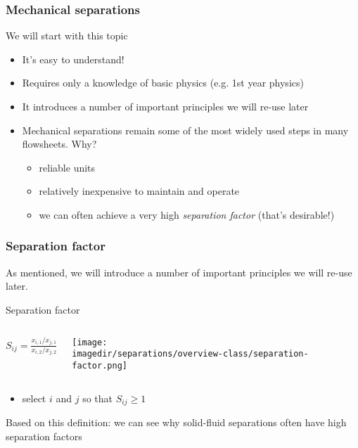 \begin{frame}\frametitle{Mechanical separations}
	We will start with this topic
	\begin{itemize}
		\item	It's easy to understand!
		\item	Requires only a knowledge of basic physics (e.g. 1st year physics)
		\item	It introduces a number of important principles we will re-use later
		\item	Mechanical separations remain some of the most widely used steps in many flowsheets. Why?
		\begin{itemize}
			\item	reliable units
			\item	relatively inexpensive to maintain and operate
			\item	we can often achieve a very high \emph{separation factor} (that's desirable!)
		\end{itemize}
	\end{itemize}
\end{frame}

\begin{frame}\frametitle{Separation factor}
	As mentioned, we will introduce a number of important principles we will re-use later.
	
	\begin{exampleblock}{Separation factor}
		\begin{columns}[c]
				$S_{ij} = \displaystyle \frac{x_{i,1} / x_{j,1}}{x_{i,2} / x_{j,2}}$
				\begin{center}
					\texttt{[image: \\imagedir/separations/overview-class/separation-factor.png]}
				\end{center}
		\end{columns} 
	\end{exampleblock}
	
	\begin{itemize}
		\item	select $i$ and $j$ so that $S_{ij} \geq 1$
	\end{itemize}
	
	Based on this definition: we can see why solid-fluid separations often have high separation factors
\end{frame}

